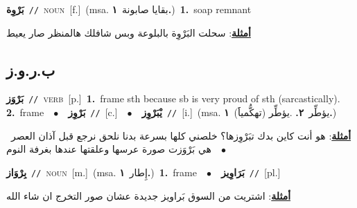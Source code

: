 \documentclass[10pt,a4paper,twoside]{article} %
\begin{document}
\begin{multicols}{2}
{\setlength\topsep{0pt}\textbf{\foreignlanguage{arabic}{بَرْوِة}}\ {\color{gray}\texttt{//}\color{black}}\ \textsc{noun}\ [f.]\ \color{gray}(msa. \foreignlanguage{arabic}{بقايا صابونة}~\foreignlanguage{arabic}{\textbf{١.}})\color{black}\ \textbf{1.}~soap remnant\  \begin{flushright}\color{gray}\foreignlanguage{arabic}{\textbf{\underline{\foreignlanguage{arabic}{أمثلة}}}: سحلت البَرْوِة بالبلوعة وبس شافلك هالمنظر صار يعيط}\end{flushright}\color{black}} \vspace{2mm}

\vspace{-3mm}
\subsection*{\color{blue}\foreignlanguage{arabic}{ب.ر.و.ز}\color{blue}{}} 

{\setlength\topsep{0pt}\textbf{\foreignlanguage{arabic}{بَرْوَز}}\ {\color{gray}\texttt{//}\color{black}}\ \textsc{verb}\ [p.]\ \textbf{1.}~frame sth because sb is very proud of sth (sarcastically).  \textbf{2.}~frame\ \ $\bullet$\ \ \setlength\topsep{0pt}\textbf{\foreignlanguage{arabic}{بَرْوِز}}\ {\color{gray}\texttt{//}\color{black}}\ [c.]\ \ $\bullet$\ \ \setlength\topsep{0pt}\textbf{\foreignlanguage{arabic}{يْبَرْوِز}}\ {\color{gray}\texttt{//}\color{black}}\ [i.]\ \color{gray}(msa. \foreignlanguage{arabic}{يؤطِّر}~\foreignlanguage{arabic}{\textbf{٢.}}  .\foreignlanguage{arabic}{يؤطِّر (تهكُّمياََ)}~\foreignlanguage{arabic}{\textbf{١.}})\color{black}\  \begin{flushright}\color{gray}\foreignlanguage{arabic}{\textbf{\underline{\foreignlanguage{arabic}{أمثلة}}}: هو أنت كاين بدك تبَرْوِزها؟ خلصني كلها بسرعة بدنا نلحق نرجع قبل آذان العصر\ $\bullet$\ \  هي بَرْوَزت صورة عرسها وعلقتها عندها بغرفة النوم}\end{flushright}\color{black}} \vspace{2mm}

{\setlength\topsep{0pt}\textbf{\foreignlanguage{arabic}{بِرْوَاز}}\ {\color{gray}\texttt{//}\color{black}}\ \textsc{noun}\ [m.]\ \color{gray}(msa. \foreignlanguage{arabic}{إِطار}~\foreignlanguage{arabic}{\textbf{١.}})\color{black}\ \textbf{1.}~frame\ \ $\bullet$\ \ \setlength\topsep{0pt}\textbf{\foreignlanguage{arabic}{بَرَاوِيز}}\ {\color{gray}\texttt{//}\color{black}}\ [pl.]\  \begin{flushright}\color{gray}\foreignlanguage{arabic}{\textbf{\underline{\foreignlanguage{arabic}{أمثلة}}}: اشتريت من السوق بَراويز جديدة عشان صور التخرج ان شاء الله}\end{flushright}\color{black}} \vspace{2mm}


\end{multicols}
\end{document}
